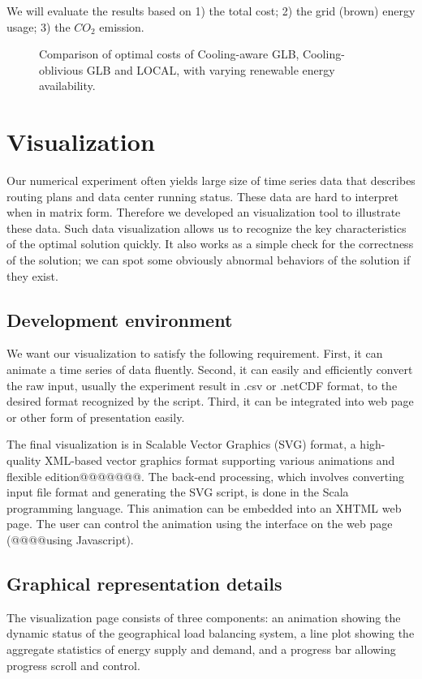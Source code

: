 \documentclass{acm_proc_article-sp}
\begin{document}
We will evaluate the results based on 1) the total cost; 2) the grid (brown) energy usage; 3) the $CO_2$ emission.


\begin{figure*}
\centering
{}
\caption{Comparison of optimal costs of Cooling-aware GLB, Cooling-oblivious GLB and LOCAL, with varying renewable energy availability.}
\end{figure*}
\section{Visualization}
Our numerical experiment often yields large size of time series data that describes routing plans and data center running status. These data are hard to interpret when in matrix form. Therefore we developed an visualization tool to illustrate these data. Such data visualization allows us to recognize the key characteristics of the optimal solution quickly. It also works as a simple check for the correctness of the solution; we can spot some obviously abnormal behaviors of the solution if they exist. 


\subsection{Development environment}
We want our visualization to satisfy the following requirement. First, it can animate a time series of data fluently. Second, it can easily and efficiently convert the raw input, usually the experiment result in .csv or .netCDF format, to the desired format recognized by the script. Third, it can be integrated into web page or other form of presentation easily. 

The final visualization is in Scalable Vector Graphics (SVG) format, a high-quality XML-based vector graphics format supporting various animations and flexible edition@@@@@@@. The back-end processing, which involves converting input file format and generating the SVG script, is done in the Scala programming language. This animation can be embedded into an XHTML web page. The user can control the animation using the interface on the web page (@@@@using Javascript).

\subsection{Graphical representation details}
The visualization page consists of three components: an animation showing the dynamic status of the geographical load balancing system, a line plot showing the aggregate statistics of energy supply and demand, and a progress bar allowing progress scroll and control.
\end{document}

